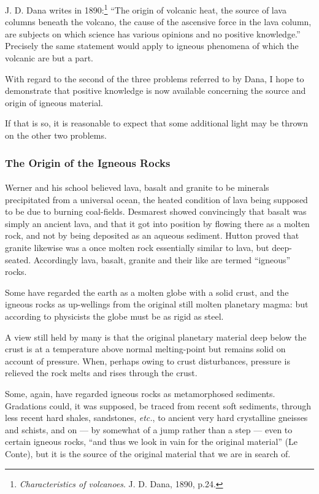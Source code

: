 \documentclass[a4paper, 12pt, oneside]{article}
\begin{document}
J. D. Dana writes in 1890:\footnote{\emph{Characteristics of volcanoes}. J. D. Dana, 1890, p.24.} ``The origin of volcanic heat, the source of lava columns beneath the volcano, the cause of the ascensive force in the lava column, are subjects on which science has various opinions and no positive knowledge.'' Precisely the same statement would apply to igneous phenomena of which the volcanic are but a part.

With regard to the second of the three problems referred to by Dana, I hope to demonstrate that positive knowledge is now available concerning the source and origin of igneous material.

If that is so, it is reasonable to expect that some additional light may be thrown on the other two problems.

\subsubsection{The Origin of the Igneous Rocks}
\paragraph{}
Werner and his school believed lava, basalt and granite to be minerals precipitated from a universal ocean, the heated condition of lava being supposed to be due to burning coal-fields. Desmarest showed convincingly that basalt was simply an ancient lava, and that it got into position by flowing there as a molten rock, and not by being deposited as an aqueous sediment. Hutton proved that granite likewise was a once molten rock essentially similar to lava, but deep-seated. Accordingly lava, basalt, granite and their like are termed ``igneous'' rocks.

Some have regarded the earth as a molten globe with a solid crust, and the igneous rocks as up-wellings from the original still molten planetary magma: but according to physicists the globe must be as rigid as steel.

A view still held by many is that the original planetary material deep below the crust is at a temperature above normal melting-point but remains solid on account of pressure. When, perhaps owing to crust disturbances, pressure is relieved the rock melts and rises through the crust.

Some, again, have regarded igneous rocks as metamorphosed sediments. Gradations could, it was supposed, be traced from recent soft sediments, through less recent hard shales, sandstones, \emph{etc.}, to ancient very hard crystalline gneisses and schists, and on --- by somewhat of a jump rather than a step --- even to certain igneous rocks, ``and thus we look in vain for the original material'' (Le Conte), but it is the source of the original material that we are in search of.
\end{document}
